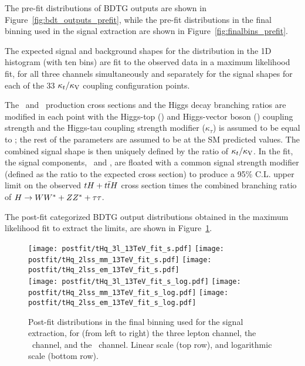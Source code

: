 The pre-fit distributions of BDTG outputs are shown in Figure~\ref{fig:bdt_outputs_prefit}, while the pre-fit distributions in the final binning used in the signal extraction are shown in Figure~\ref{fig:finalbins_prefit}.

The expected signal and background shapes for the distribution in the 1D histogram (with ten bins) are fit to the observed data in a maximum likelihood fit, for all three channels simultaneously and separately for the signal shapes for each of the 33 $\kappa_t/\kappa_\text{V}$ coupling configuration points.

The \tH\ and \ttH\ production cross sections and the Higgs decay branching ratios are modified in each point with the Higgs-top (\Ct) and Higgs-vector boson (\CV) coupling strength and the Higgs-tau coupling strength modifier ($\kappa_\tau$) is assumed to be equal to \Ct; %
the rest of the parameters are assumed to be at the SM predicted values. The combined signal shape is then uniquely defined by the ratio of $\kappa_t/\kappa_\text{V}$. In the fit, the signal components, \tH\ and \ttH, are floated with a common signal strength modifier (defined as the ratio to the expected cross section) to produce a 95\% C.L. upper limit on the observed $tH+t\bar{t}H$ cross section times the combined branching ratio of $H\to WW^* + ZZ^* + \tau\tau$.

The post-fit categorized BDTG output distributions obtained in the maximum likelihood fit to extract the limits, are shown in Figure~\ref{fig:postfit}.

\begin{figure} [!h]
 \centering
 \texttt{[image: postfit/tHq\_3l\_13TeV\_fit\_s.pdf]}
 \texttt{[image: postfit/tHq\_2lss\_mm\_13TeV\_fit\_s.pdf]}
 \texttt{[image: postfit/tHq\_2lss\_em\_13TeV\_fit\_s.pdf]} \\
 \texttt{[image: postfit/tHq\_3l\_13TeV\_fit\_s\_log.pdf]}
 \texttt{[image: postfit/tHq\_2lss\_mm\_13TeV\_fit\_s\_log.pdf]}
 \texttt{[image: postfit/tHq\_2lss\_em\_13TeV\_fit\_s\_log.pdf]}
\caption[Post-fit distributions in the final binning.]{Post-fit distributions in the final binning used for the signal extraction, for (from left to right) the three lepton channel, the \mumu\ channel, and the \emu\ channel. Linear scale (top row), and logarithmic scale (bottom row).}
\label{fig:postfit}
\end{figure}

